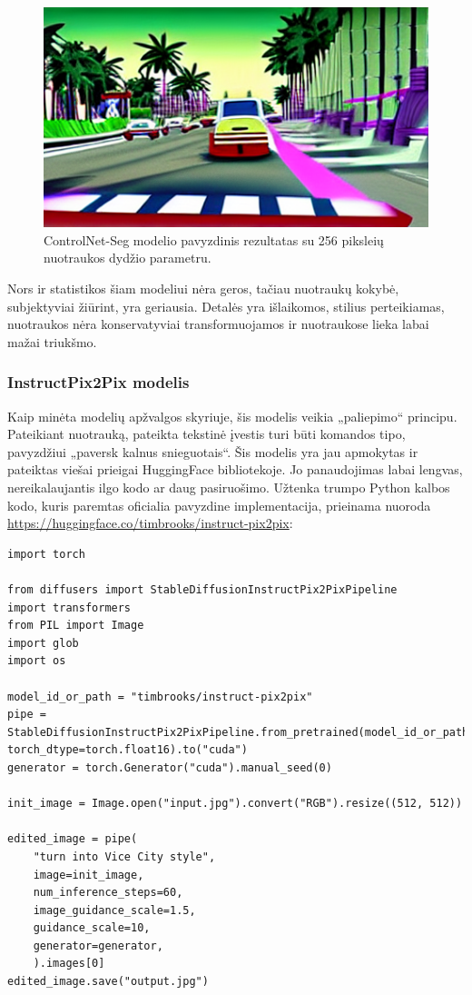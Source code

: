 \documentclass{VUMIFPSbakalaurinis}
\begin{document}
            \begin{figure}[H]
                \centering
                \includegraphics[scale=1]{img/diffusion/controlnet/256}
                \caption{ControlNet-Seg modelio pavyzdinis rezultatas su 256 piksleių nuotraukos dydžio parametru.}
                \label{img:control_256}
            \end{figure}

            Nors ir statistikos šiam modeliui nėra geros, tačiau nuotraukų kokybė, subjektyviai žiūrint, yra geriausia. Detalės yra išlaikomos, stilius perteikiamas, nuotraukos nėra konservatyviai transformuojamos ir nuotraukose lieka labai mažai triukšmo.

        \subsubsection{InstructPix2Pix modelis}
            Kaip minėta modelių apžvalgos skyriuje, šis modelis veikia „paliepimo“ principu. Pateikiant nuotrauką, pateikta tekstinė įvestis turi būti komandos tipo, pavyzdžiui „paversk kalnus snieguotais“. Šis modelis yra jau apmokytas ir pateiktas viešai prieigai HuggingFace bibliotekoje. Jo panaudojimas labai lengvas, nereikalaujantis ilgo kodo ar daug pasiruošimo. Užtenka trumpo Python kalbos kodo, kuris paremtas oficialia pavyzdine implementacija, prieinama nuoroda \href{https://huggingface.co/timbrooks/instruct-pix2pix}{https://huggingface.co/timbrooks/instruct-pix2pix}:

            \begin{lstlisting}
import torch

from diffusers import StableDiffusionInstructPix2PixPipeline
import transformers
from PIL import Image
import glob
import os

model_id_or_path = "timbrooks/instruct-pix2pix"
pipe = StableDiffusionInstructPix2PixPipeline.from_pretrained(model_id_or_path, torch_dtype=torch.float16).to("cuda")
generator = torch.Generator("cuda").manual_seed(0)

init_image = Image.open("input.jpg").convert("RGB").resize((512, 512))

edited_image = pipe(
    "turn into Vice City style",
    image=init_image,
    num_inference_steps=60,
    image_guidance_scale=1.5,
    guidance_scale=10,
    generator=generator,
    ).images[0]
edited_image.save("output.jpg")
            \end{lstlisting}
\end{document}
